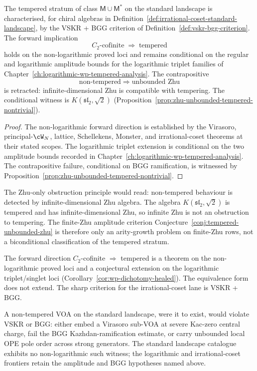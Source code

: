 \begin{corollary}
\label{cor:tempered-criterion-refined}
\ClaimStatusConditional
The tempered stratum of class $\mathsf{M} \cup \mathsf{M}^*$ on the
standard landscape is characterised, for chiral algebras in
Definition~\ref{def:irrational-coset-standard-landscape}, by the
VSKR + BGG criterion of Definition~\ref{def:vskr-bgg-criterion}. The
forward implication
\[
 C_2\text{-cofinite} \;\Longrightarrow\; \text{tempered}
\]
holds on the non-logarithmic proved loci and remains conditional on the
regular and logarithmic amplitude bounds for the logarithmic triplet
families of Chapter~\ref{ch:logarithmic-wp-tempered-analysis}. The
contrapositive
\[
 \text{non-tempered} \;\Longrightarrow\; \text{unbounded Zhu}
\]
is retracted: infinite-dimensional Zhu is compatible with tempering.
The conditional witness is $K(\mathfrak{sl}_2, \sqrt{2})$
(Proposition~\ref{prop:zhu-unbounded-tempered-nontrivial}).
\end{corollary}

\begin{proof}
The non-logarithmic forward direction is established by the Virasoro,
principal-\(\cW_N\), lattice, Schellekens, Monster, and irrational-coset
theorems at their stated scopes. The logarithmic triplet extension is
conditional on the two amplitude bounds recorded in
Chapter~\ref{ch:logarithmic-wp-tempered-analysis}. The contrapositive
failure, conditional on BGG ramification, is witnessed by
Proposition~\ref{prop:zhu-unbounded-tempered-nontrivial}.
\end{proof}

\begin{remark}
\label{rem:conjecture-tempered-unbounded-zhu-retracted}
The Zhu-only obstruction principle would read: non-tempered behaviour
is detected by infinite-dimensional Zhu algebra. The algebra
$K(\mathfrak{sl}_2, \sqrt{2})$ is tempered and has
infinite-dimensional Zhu, so infinite Zhu is not an obstruction to
tempering. The finite-Zhu amplitude criterion
Conjecture~\ref{conj:tempered-unbounded-zhu} is therefore only an
arity-growth problem on finite-Zhu rows, not a biconditional
classification of the tempered stratum.

The forward direction $C_2$-cofinite $\Longrightarrow$ tempered is a
theorem on the non-logarithmic proved loci and a conjectural extension
on the logarithmic triplet/singlet loci
(Corollary~\ref{cor:wp-dichotomy-healed}). The equivalence form does
not extend. The sharp criterion for the irrational-coset lane is
VSKR + BGG.

A non-tempered VOA on the standard landscape, were it to exist, would
violate VSKR or BGG: either embed a Virasoro sub-VOA at severe
Kac-zero central charge, fail the BGG Kazhdan-ramification estimate,
or carry unbounded local OPE pole order across strong generators. The
standard landscape catalogue exhibits no non-logarithmic such witness;
the logarithmic and irrational-coset frontiers retain the amplitude
and BGG hypotheses named above.
\end{remark}

